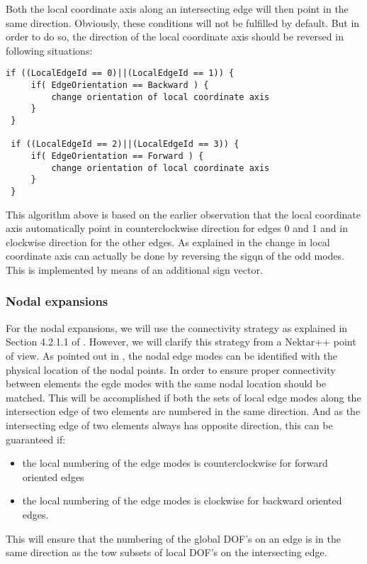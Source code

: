 Both the local coordinate axis along an intersecting edge will then point in the
same direction. Obviously, these conditions will not be fulfilled by default.
But in order to do so, the direction of the local coordinate axis should be
reversed in following situations:
\begin{lstlisting}[style=C++Style]
 if ((LocalEdgeId == 0)||(LocalEdgeId == 1)) {
     if( EdgeOrientation == Backward ) {
         change orientation of local coordinate axis
     }
 }

 if ((LocalEdgeId == 2)||(LocalEdgeId == 3)) {
     if( EdgeOrientation == Forward ) {
         change orientation of local coordinate axis
     }
 }
\end{lstlisting}
This algorithm above is based on the earlier observation that the local
coordinate axis automatically point in counterclockwise direction for edges 0
and 1 and in clockwise direction for the other edges. As explained in \cite{KaSh05}
the change in local coordinate axis can actually be done by reversing the sigqn
of the odd modes. This is implemented by means of an additional sign vector.

\subsubsection{Nodal expansions}

For the nodal expansions, we will use the connectivity strategy as explained in
Section 4.2.1.1 of \cite{KaSh05}. However, we will clarify this strategy from a
Nektar++ point of view. As pointed out in \cite{KaSh05}, the nodal edge modes
can be identified with the physical location of the nodal points. In order to ensure
proper connectivity between elements the egde modes with the same nodal location
should be matched. This will be accomplished if both the sets of local edge
modes along the intersection edge of two elements are numbered in the same
direction. And as the intersecting edge of two elements always has opposite
direction, this can be guaranteed if:
\begin{itemize}
\item the local numbering of the edge modes is counterclockwise for forward
 oriented edges
\item the local numbering of the edge modes is clockwise for backward oriented
edges.
\end{itemize}

This will ensure that the numbering of the global DOF's on an edge is in the
same direction as the tow subsets of local DOF's on the intersecting edge.

